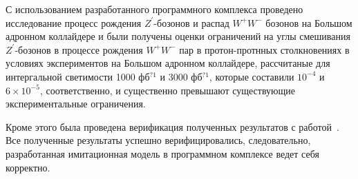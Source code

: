 С использованием разработанного программного комплекса проведено исследование процесс рождения ${Z}^{\prime}$-бозонов и распад ${W}^{+}{W}^{-}$ бозонов на Большом адронном коллайдере и были получены оценки ограничений на углы смешивания ${Z}^{\prime}$-бозонов в
процессе рождения ${W}^{+}$${W}^{-}$ пар в протон-протнных столкновениях
в условиях экспериментов на Большом адронном коллайдере, рассчитаные для интергальной светимости 1000 фб${}^{?1}$ и 3000 фб${}^{?1}$, которые составили  ${10}^{-4}$ и $6\times{10}^{-5}$, соответственно, и существенно превышают существующие экспериментальные ограничения.

Кроме этого была проведена верификация полученных результатов с
работой~\cite{2part-pankov}. Все полученные результаты успешно верифицировались,
следовательно, разработанная имитационная модель в программном комплексе
ведет себя корректно.